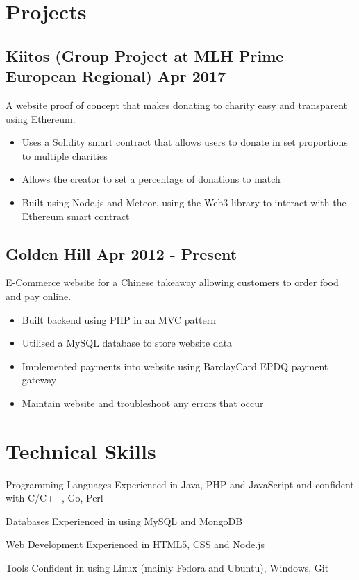 \documentclass[a4paper]{article}
\begin{document}
\section*{Projects}

\subsection*{Kiitos \textnormal{(Group Project at MLH Prime European Regional)} \hfill Apr 2017}

A website proof of concept that makes donating to charity easy and transparent using Ethereum.

\begin{itemize}
    \item Uses a Solidity smart contract that allows users to donate in set proportions to multiple charities
    \item Allows the creator to set a percentage of donations to match
    \item Built using Node.js and Meteor, using the Web3 library to interact with the Ethereum smart contract
\end{itemize}

\subsection*{Golden Hill \hfill Apr 2012 - Present}

E-Commerce website for a Chinese takeaway allowing customers to order food and pay online.

\begin{itemize}
    \item Built backend using PHP in an MVC pattern
    \item Utilised a MySQL database to store website data
    \item Implemented payments into website using BarclayCard EPDQ payment gateway
    \item Maintain website and troubleshoot any errors that occur
\end{itemize}

\section*{Technical Skills}

\vspace{6pt}

\begin{eqlist}
    \item[Programming Languages] Experienced in Java, PHP and JavaScript and confident with C/C++, Go, Perl
    \item[Databases] Experienced in using MySQL and MongoDB
    \item[Web Development] Experienced in HTML5, CSS and Node.js
    \item[Tools] Confident in using Linux (mainly Fedora and Ubuntu), Windows, Git
\end{eqlist}
\end{document}
